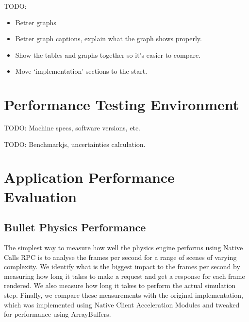 TODO:
\begin{itemize}
  \item Better graphs
  \item Better graph captions, explain what the graph shows properly.
  \item Show the tables and graphs together so it's easier to compare.
  \item Move `implementation' sections to the start.
\end{itemize}
\section{Performance Testing Environment} %
\label{sec:performance_testing_environment}
TODO: Machine specs, software versions, etc.

TODO: Benchmarkjs, uncertainties calculation.

\section{Application Performance Evaluation} %
\label{sec:application_performance_evaluation}
\subsection{Bullet Physics Performance} %
\label{sub:bullet_physics_performance}
The simplest way to measure how well the physics engine performs using Native Calls RPC is to analyse the frames per second for a range of scenes of varying complexity. We identify what is the biggest impact to the frames per second by measuring how long it takes to make a request and get a response for each frame rendered. We also measure how long it takes to perform the actual simulation step. Finally, we compare these measurements with the original implementation, which was implemented using Native Client Acceleration Modules and tweaked for performance using ArrayBuffers.


